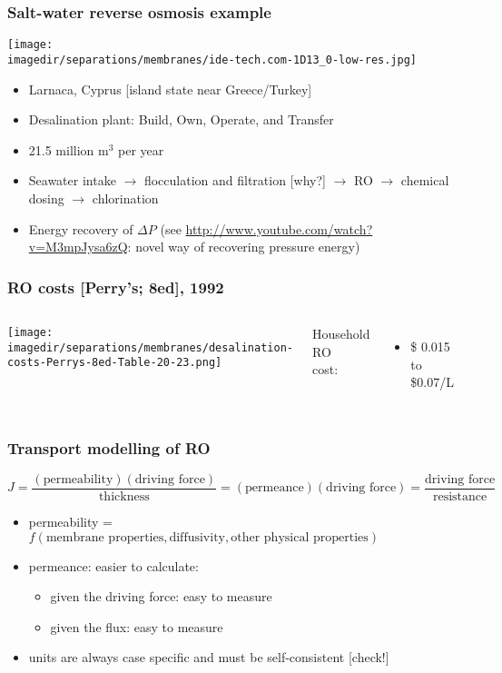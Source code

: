 \begin{frame}\frametitle{Salt-water reverse osmosis example}
	\texttt{[image: \\imagedir/separations/membranes/ide-tech.com-1D13\_0-low-res.jpg]}
	\begin{itemize}
		\item	Larnaca, Cyprus [island state near Greece/Turkey]
		\item	Desalination plant: Build, Own, Operate, and Transfer
		\item	21.5 million $\text{m}^3$ per year
		\item	Seawater intake $\rightarrow$ flocculation and filtration [why?] $\rightarrow$ RO $\rightarrow$ chemical dosing $\rightarrow$ chlorination
		\item	Energy recovery of $\Delta P$ {\tiny (see \href{http://www.youtube.com/watch?v=M3mpJysa6zQ}{http://www.youtube.com/watch?v=M3mpJysa6zQ}: novel way of recovering pressure energy)}
	\end{itemize}
\end{frame}

\begin{frame}\frametitle{RO costs [Perry's; 8ed], 1992}
	\begin{columns}[t]
			\begin{center}
				\texttt{[image: \\imagedir/separations/membranes/desalination-costs-Perrys-8ed-Table-20-23.png]}
			\end{center}
			Household RO\\
			cost:
			\begin{itemize}
				\item	\$ 0.015 to \$0.07/L %
			\end{itemize}
	\end{columns}
\end{frame}

\begin{frame}\frametitle{Transport modelling of RO}
	{\color{myOrange}{Symbolically:}}
	{ \small
	\[
		J = \frac{(\text{permeability})(\text{driving force})}{\text{thickness}} = \displaystyle (\text{permeance})(\text{driving force}) = \dfrac{\text{driving force}}{\text{resistance}}
	\]
	}
	\begin{itemize}
		\item	permeability = $f(\text{membrane properties}, \text{diffusivity}, \text{other physical properties})$
		\item	permeance: easier to calculate:
		\begin{itemize}
			\item	given the driving force: easy to measure
			\item	given the flux: easy to measure
		\end{itemize}
		\item	units are always case specific and must be self-consistent [check!]
	\end{itemize}
\end{frame}

